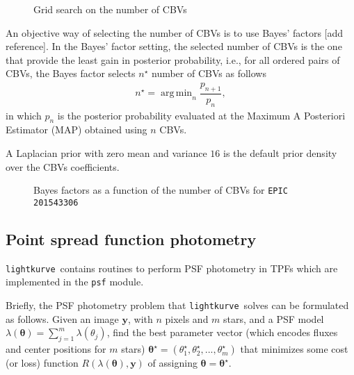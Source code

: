 \documentclass[twocolumn]{aastex62}
\newcommand{\lightkurve}{\texttt{lightkurve}}
\DeclareMathOperator*{\argmin}{arg\,min}
\begin{document}
\begin{figure}[!htb]
    \centering
    \caption{Grid search on the number of CBVs}
    \label{fig:cbv-grid-search}
\end{figure}

An objective way of selecting the number of CBVs is to use Bayes' factors
[add reference]. In the Bayes' factor setting, the selected number of
CBVs is the one that provide the least gain in posterior probability, i.e.,
for all ordered pairs of CBVs, the Bayes factor selects $n^{\star}$ number of CBVs
as follows
\begin{align}
    n^{\star} = \argmin_{n} \dfrac{p_{n+1}}{p_n},
\end{align}
in which $p_n$ is the posterior probability evaluated at the Maximum A Posteriori
Estimator (MAP) obtained using $n$ CBVs.

A Laplacian prior with zero mean and variance $16$ is the default prior
density over the CBVs coefficients.

\begin{figure}[!htb]
    \centering
    \caption{Bayes factors as a function of the number of CBVs for \texttt{EPIC 201543306}}
    \label{fig:cbv-grid-search}
\end{figure}


\subsection{Point spread function photometry}

\lightkurve ~contains routines to perform PSF photometry in TPFs
which are implemented in the \texttt{psf} module.

Briefly, the PSF photometry problem that \lightkurve~solves can be formulated as
follows. Given an image $\bm{y}$, with $n$ pixels and $m$ stars, and a PSF model
$\lambda(\bm{\theta}) = \sum_{j=1}^{m} \lambda({\theta}_j)$,
find the best parameter vector (which encodes fluxes and center positions for $m$
stars) $\bm{\theta}^{\star} = (\theta_1^{\star}, \theta_2^{\star}, ..., \theta_m^{\star})$
that minimizes some cost (or loss) function $R(\lambda(\bm{\theta}), \bm{y})$
of assigning $\bm{\theta} = \bm{\theta}^{\star}$.
\end{document}

